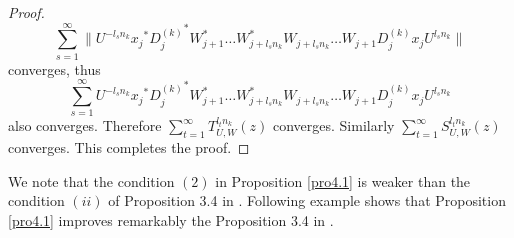 \documentclass{article}
\begin{document}
\begin{proof}
\[\sum^{\infty}_{s=1}\|U^{-l_{s}n_{k}}{x_{j}}^{\ast}{D^{(k)}_{j}}^{\ast}{W^{\ast}_{j+1}}\ldots {W^{\ast}_{j+l_{s}n_{k}}}W_{j+l_{s}n_{k}}\ldots W_{j+1}D^{(k)}_{j}x_{j}U^{l_{s}n_{k}}\|\] converges, thus
\[\sum^{\infty}_{s=1}U^{-l_{s}n_{k}}{x_{j}}^{\ast}{D^{(k)}_{j}}^{\ast}{W^{\ast}_{j+1}}\ldots {W^{\ast}_{j+l_{s}n_{k}}}W_{j+l_{s}n_{k}}\ldots W_{j+1}D^{(k)}_{j}x_{j}U^{l_{s}n_{k}}\] also converges. Therefore $\sum^{\infty}_{t=1}T^{l_{t}n_{k}}_{U,W}(z)$ converges.
Similarly $\sum^{\infty}_{t=1}S^{l_{t}n_{k}}_{U,W}(z)$ converges. This completes the proof.
\end{proof}

We note that the condition $(2)$ in Proposition \ref{pro4.1} is weaker than the condition $(ii)$ of Proposition 3.4 in  \cite{I24}. Following example shows that Proposition \ref{pro4.1} improves  remarkably the Proposition 3.4 in  \cite{I24}.
\end{document}
